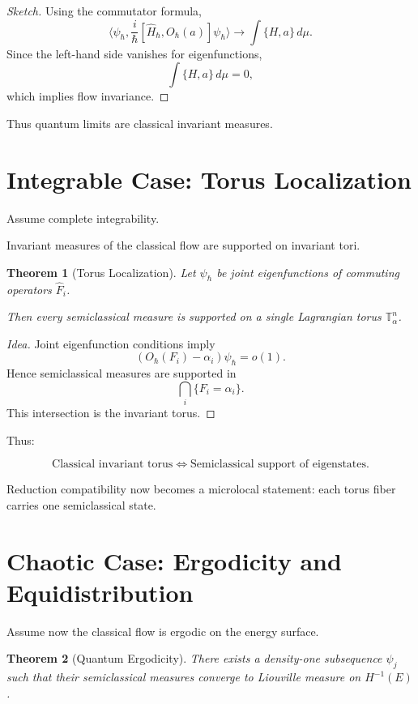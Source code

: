 \documentclass[11pt]{article}
\newtheorem{theorem}{Theorem}[section]
\begin{document}
\begin{proof}[Sketch]
Using the commutator formula,
\[
\langle \psi_\hbar, 
\frac{i}{\hbar}[\hat H_\hbar,O_\hbar(a)]
\psi_\hbar \rangle
\to
\int \{H,a\}\,d\mu.
\]
Since the left-hand side vanishes for eigenfunctions,
\[
\int \{H,a\}\,d\mu = 0,
\]
which implies flow invariance.
\end{proof}

Thus quantum limits are classical invariant measures.

\section{Integrable Case: Torus Localization}

Assume complete integrability.

Invariant measures of the classical flow are supported on invariant tori.

\begin{theorem}[Torus Localization]
Let $\psi_\hbar$ be joint eigenfunctions of commuting operators
$\hat F_i$.

Then every semiclassical measure is supported on a single
Lagrangian torus $\mathbb{T}^n_\alpha$.
\end{theorem}

\begin{proof}[Idea]
Joint eigenfunction conditions imply
\[
(O_\hbar(F_i)-\alpha_i)\psi_\hbar = o(1).
\]
Hence semiclassical measures are supported in
\[
\bigcap_i \{F_i=\alpha_i\}.
\]
This intersection is the invariant torus.
\end{proof}

Thus:

\[
\boxed{
\text{Classical invariant torus}
\Longleftrightarrow
\text{Semiclassical support of eigenstates}.
}
\]

Reduction compatibility now becomes a microlocal statement:
each torus fiber carries one semiclassical state.

\section{Chaotic Case: Ergodicity and Equidistribution}

Assume now the classical flow is ergodic on the energy surface.

\begin{theorem}[Quantum Ergodicity]
There exists a density-one subsequence $\psi_j$ such that
their semiclassical measures converge to Liouville measure on
$H^{-1}(E)$.
\end{theorem}
\end{document}
